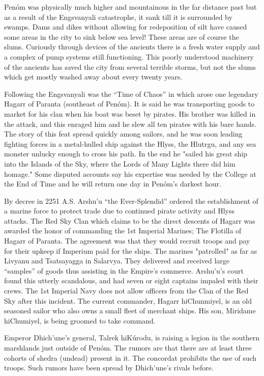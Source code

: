 Penóm was physically much higher and mountainous in the far distance past but as a result of the Engsvanyali catastrophe, it sank till it is surrounded by swamps. Dams and dikes without allowing for redeposition of silt have caused some areas in the city to sink below sea level! These areas are of course the slums. Curiously through devices of the ancients there is a fresh water supply and a complex of pump systems still functioning. This poorly understood machinery of the ancients has saved the city from several terrible storms, but not the slums which get mostly washed away about every twenty years.

Following the Engsvanyali was the ``Time of Chaos'' in which arose one legendary Hagarr of Paranta (southeast of Penóm). It is said he was transporting goods to market for his clan when his boat was beset by pirates. His brother was killed in the attack, and this enraged him and he slew all ten pirates with his bare hands. The story of this feat spread quickly among sailors, and he was soon leading fighting forces in a metal-hulled ship against the Hlyss, the Hlutrgu, and any sea monster unlucky enough to cross his path. In the end he "sailed his great ship into the Islands of the Sky, where the Lords of Many Lights there did him homage." Some disputed accounts say his expertise was needed by the College at the End of Time and he will return one day in Penóm's darkest hour.

By decree in 2251 A.S. Arshu'u ``the Ever-Splendid'' ordered the establishment of a marine force to protect trade due to continued pirate activity and Hlyss attacks. The Red Sky Clan which claims to be the direct descents of Hagarr was awarded the honor of commanding the 1st Imperial Marines; The Flotilla of Hagarr of Paranta. The agreement was that they would recruit troops and pay for their upkeep if Imperium paid for the ships. The marines "patrolled" as far as Livyanu and Tsatsayagga in Salarvya. They delivered and received large ``samples'' of goods thus assisting in the Empire's commerce. Arshu'u's court found this utterly scandalous, and had seven or eight captains impaled with their crews. The 1st Imperial Navy does not allow officers from the Clan of the Red Sky after this incident. The current commander, Hagarr hiChunmiyel, is an old seasoned sailor who also owns a small fleet of merchant ships. His son, Miridame hiChumiyel, is being groomed to take command.

Emperor Dhich'une's general, Talrek hiKúrodu, is raising a legion in the southern marshlands just outside of Penóm. The rumors are that there are at least three cohorts of shedra (undead) present in it. The concordat prohibits the use of such troops. Such rumors have been spread by Dhich'une's rivals before.

